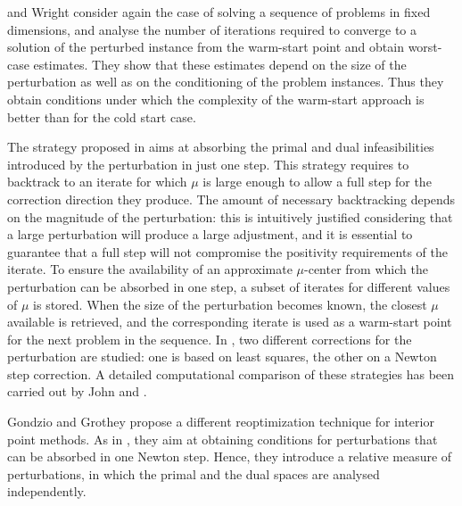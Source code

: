 \yildirim and Wright \cite{YildirimWright} consider again the case 
of solving a sequence of problems in fixed dimensions, and
analyse the number of iterations required to converge to a 
solution of the perturbed instance from the warm-start point and 
obtain worst-case estimates.
They show that these estimates depend on the size of the perturbation 
as well as on the conditioning %
of the problem 
instances. Thus they obtain conditions under which the complexity 
of the warm-start approach is better than for the cold start case.

The strategy proposed in \cite{YildirimWright} aims at absorbing the 
primal and dual infeasibilities introduced by the perturbation in just 
one step.
This strategy requires to backtrack to an iterate for which $\mu$ is 
large enough to allow a full step for the correction direction they produce. 
The amount of necessary backtracking depends on the magnitude 
of the perturbation:
this is intuitively justified considering that a large perturbation 
will produce a large adjustment, and it is essential to guarantee that 
a full step will not compromise the positivity requirements of the 
iterate.
%
To ensure the availability of an approximate $\mu$-center from which 
the perturbation can be absorbed in one step, a subset of 
iterates for different values of $\mu$ is stored.
When the size of the perturbation becomes known, the closest $\mu$ 
available is retrieved, and the corresponding iterate is used as a 
warm-start point for the next problem in the sequence.
%
In \cite{YildirimWright}, two different corrections for the perturbation
are studied: one is based on least squares, the other on a Newton step 
correction.
A detailed computational comparison of these strategies has been 
carried out by John and \yildirim \cite{JohnYildirim}.

Gondzio and Grothey \cite{GondzioGrothey03} propose a different 
reoptimization technique for interior point methods.
As in \cite{YildirimWright}, they aim at obtaining conditions for 
perturbations that can be absorbed in one Newton step.
Hence, they introduce a relative measure of perturbations, in which 
the primal and the dual spaces are analysed independently.

